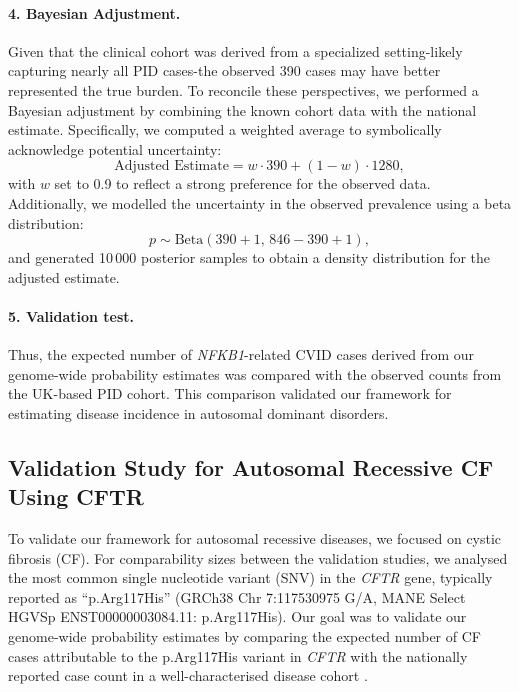 \paragraph{4. Bayesian Adjustment.}
Given that the clinical cohort was derived from a specialized setting-likely capturing nearly all PID cases-the observed 390 cases may have better represented the true burden. To reconcile these perspectives, we performed a Bayesian adjustment by combining the known cohort data with the national estimate. Specifically, we computed a weighted average to symbolically acknowledge potential uncertainty:
\[
\text{Adjusted Estimate} = w \cdot 390 + (1 - w) \cdot 1280,
\]
with \(w\) set to 0.9 to reflect a strong preference for the observed data.
Additionally, we modelled the uncertainty in the observed prevalence using a beta distribution:
\[
p \sim \mathrm{Beta}(390+1,\,846-390+1),
\]
and generated 10\,000 posterior samples to obtain a density distribution for the adjusted estimate.

\paragraph{5. Validation test.}
Thus, the expected number of \textit{NFKB1}-related CVID cases derived from our genome-wide probability estimates was compared with the observed counts from the UK-based PID cohort. This comparison validated our framework for estimating disease incidence in autosomal dominant disorders.

\subsection{Validation Study for Autosomal Recessive CF Using CFTR}

To validate our framework for autosomal recessive diseases, we focused on cystic fibrosis (CF).
For comparability sizes between the validation studies, we analysed the most common single nucleotide variant (SNV) in the \textit{CFTR} gene, typically reported as ``p.Arg117His'' (GRCh38 Chr 7:117530975 G/A, MANE Select HGVSp ENST00000003084.11: p.Arg117His).
Our goal was to validate our genome-wide probability estimates by comparing the expected number of CF cases attributable to the p.Arg117His variant in \textit{CFTR} with the nationally reported case count in a well-characterised disease cohort
\cite{naito2023uk, castellani2013cftr2, Grasemann2023cftr}.

